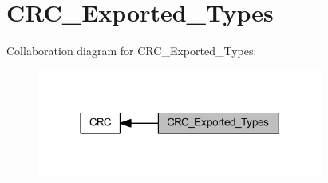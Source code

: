 \hypertarget{group___c_r_c___exported___types}{}\section{C\+R\+C\+\_\+\+Exported\+\_\+\+Types}
\label{group___c_r_c___exported___types}
Collaboration diagram for C\+R\+C\+\_\+\+Exported\+\_\+\+Types\+:
\nopagebreak
\begin{figure}[H]
\begin{center}
\leavevmode
\includegraphics[width=266pt]{group___c_r_c___exported___types}
\end{center}
\end{figure}
